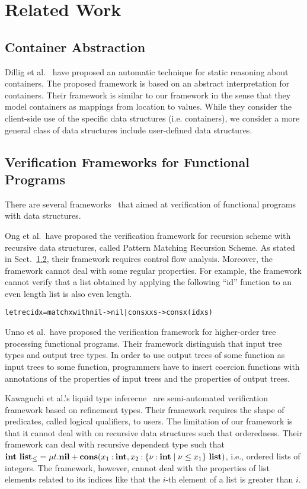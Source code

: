 \section{Related Work}
\label{sec:related}

\subsection{Container Abstraction}
Dillig et al.~\cite{Dillig2011} have proposed an automatic technique for
static reasoning about containers.  The proposed framework is based on
an abstract interpretation for containers.  Their framework is similar
to our framework in the sense that they model containers as mappings
from location to values.  While they consider the client-side use of the
specific data structures (i.e. containers), we consider a more general
class of data structures include user-defined data structures.


\subsection{Verification Frameworks for Functional Programs}
There are several
frameworks~\cite{Kawaguchi2009,Chin2003,Unno2010,Ong2011} that aimed at
verification of functional programs with data structures.

Ong et al.~have proposed the verification framework for recursion scheme with
recursive data structures, called Pattern Matching Recursion Scheme.  As stated in
Sect.~\ref{}, their framework requires control flow analysis. Moreover,
the framework cannot deal with some regular properties. For example, the
framework cannot verify that a list obtained by applying the following
``id'' function to an even length list is also even length.
\begin{alltt}
let rec id x = match x with nil -> nil | cons x xs -> cons x (id xs)
\end{alltt}

Unno et al.~have proposed the verification framework for higher-order
tree processing functional programs. Their framework distinguish that
input tree types and output tree types.  In order to use output trees of
some function as input trees to some function, programmers have to
insert coercion functions with annotations of the properties of input
trees and the properties of output trees.

Kawaguchi et al.'s liquid type inferecne~\cite{Kawaguchi2009} are
semi-automated verification framework based on refinement types.  Their
framework requires the shape of predicates, called logical qualifiers,
to users.  The limitation of our framework is that it cannot deal with
 on recursive data structures such that
orderedness.  Their framework can deal with recursive dependent type
such that ${\mathbf{int}}~{\mathbf{list}_\leq} = \mu t.\mathbf{nil} +
\mathbf{cons}({x_1\mathbin{:}\mathbf{int}},{x_2\mathbin{:}{\{\nu\mathbin{:}\mathbf{int} \mid \nu \leq
x_1\}}~{\mathbf{list}}})$, i.e., ordered lists of integers.  The framework,
however, cannot deal with the properties of list elements related to its
indices like that the $i$-th element of a list is greater than $i$.

